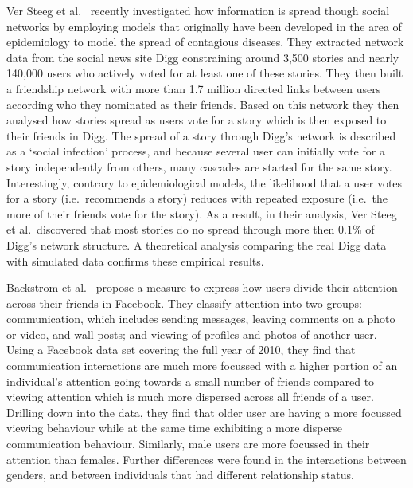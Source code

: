 \documentclass[letterpaper]{article}
\begin{document}
Ver Steeg et al.~\cite{ver2011stops} recently investigated how
information is spread though social networks by employing models that
originally have been developed in the area of epidemiology to model
the spread of contagious diseases. They extracted network data from
the social news site Digg constraining around 3,500 stories and nearly
140,000 users who actively voted for at least one of these stories.
They then built a friendship network with more than 1.7 million
directed links between users according who they nominated as their
friends. Based on this network they then analysed how stories spread
as users vote for a story which is then exposed to their friends in
Digg. The spread of a story through Digg's network is described as a
`social infection' process, and because several user can initially
vote for a  story independently from others, many cascades are started
for the same story. Interestingly, contrary to epidemiological models,
the likelihood that a user votes for a story (i.e.\ recommends a
story) reduces with repeated exposure (i.e.\ the more of their friends
vote for the story). As a result, in their analysis, Ver Steeg et
al.\ discovered that most stories do no spread through more then 0.1\%
of Digg's network structure. A theoretical analysis comparing the real
Digg data with simulated data confirms these empirical results.




Backstrom et al.~\cite{backstrom2011center} propose a measure to
express how users divide their attention across their friends in
Facebook. They classify attention into two groups: communication,
which includes sending messages, leaving comments on a photo or video,
and wall posts; and viewing of profiles and photos of another user.
Using a Facebook data set covering the full year of 2010, they find
that communication interactions are much more focussed with a
higher portion of an individual's attention going towards a small
number of friends compared to viewing attention which is much more
dispersed across all friends of a user. Drilling down into the data,
they find that older user are having a more focussed viewing behaviour
while at the same time exhibiting a more disperse communication
behaviour. Similarly, male users are more focussed in their
attention than females. Further differences were found in the
interactions between genders, and between individuals that had
different relationship status.
\end{document}
